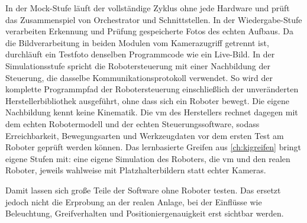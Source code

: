 In der Mock-Stufe läuft der vollständige Zyklus ohne jede Hardware und prüft das Zusammenspiel
von Orchestrator und Schnittstellen. In der Wiedergabe-Stufe verarbeiten Erkennung und Prüfung
gespeicherte Fotos des echten Aufbaus. Da die Bildverarbeitung in beiden Modulen vom
Kamerazugriff getrennt ist, durchläuft ein Testfoto denselben Programmcode wie ein Live-Bild.
In der Simulationsstufe spricht die Robotersteuerung mit einer Nachbildung der Steuerung,
die dasselbe Kommunikationsprotokoll verwendet. So wird der komplette Programmpfad der
Robotersteuerung einschließlich der unveränderten Herstellerbibliothek ausgeführt, ohne dass
sich ein Roboter bewegt. Die eigene Nachbildung kennt keine Kinematik. Die \ac{vm} des
Herstellers rechnet dagegen mit dem echten Robotermodell und der echten
Steuerungssoftware, sodass Erreichbarkeit, Bewegungsarten und Werkzeugdaten vor dem ersten
Test am Roboter geprüft werden können. Das lernbasierte Greifen aus \cref{ch:kigreifen} bringt
eigene Stufen mit: eine eigene Simulation des Roboters, die \ac{vm} und den realen Roboter,
jeweils wahlweise mit Platzhalterbildern statt echter Kameras.

Damit lassen sich große Teile der Software ohne Roboter testen. Das ersetzt jedoch nicht die
Erprobung an der realen Anlage, bei der Einflüsse wie Beleuchtung, Greifverhalten und
Positioniergenauigkeit erst sichtbar werden.
